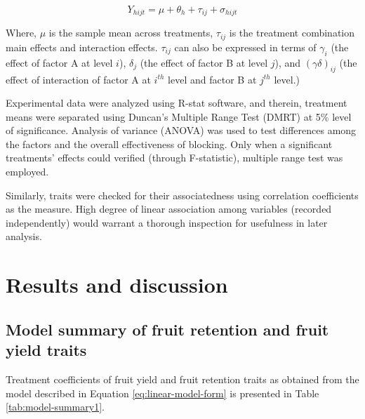 \documentclass[]{article}
\begin{document}
\begin{equation}
Y_{hijt} = \mu + \theta_{h} + \tau_{ij} + \sigma_{hijt}
\label{eq:linear-model-form}
\end{equation}

Where, \(\mu\) is the sample mean across treatments, \(\tau_{ij}\) is
the treatment combination main effects and interaction effects.
\(\tau_{ij}\) can also be expressed in terms of \(\gamma_i\) (the effect
of factor A at level \(i\)), \(\delta_j\) (the effect of factor B at
level \(j\)), and \((\gamma\delta)_{ij}\) (the effect of interaction of
factor A at \(i^{th}\) level and factor B at \(j^{th}\) level.)

Experimental data were analyzed using R-stat software, and therein,
treatment means were separated using Duncan's Multiple Range Test (DMRT)
at 5\% level of significance. Analysis of variance (ANOVA) was used to
test differences among the factors and the overall effectiveness of
blocking. Only when a significant treatments' effects could verified
(through F-statistic), multiple range test was employed.

Similarly, traits were checked for their associatedness using
correlation coefficients as the measure. High degree of linear
association among variables (recorded independently) would warrant a
thorough inspection for usefulness in later analysis.

\section{Results and discussion}\label{results-and-discussion}

\subsection{Model summary of fruit retention and fruit yield
traits}\label{model-summary-of-fruit-retention-and-fruit-yield-traits}

Treatment coefficients of fruit yield and fruit retention traits as
obtained from the model described in Equation \eqref{eq:linear-model-form}
is presented in Table \ref{tab:model-summary1}.

\begingroup  \small 
\end{document}
